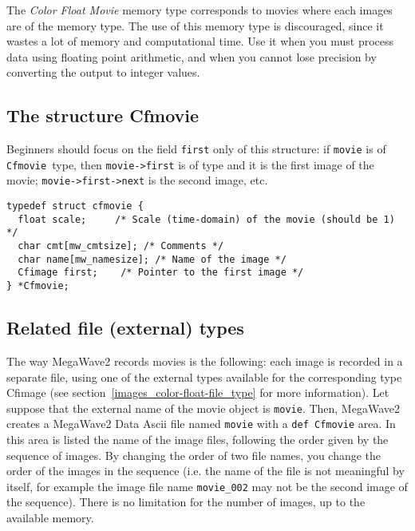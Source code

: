 \label{movies_color-float-movies}
\def\cfmovie{{\tt Cfmovie }}
\index{structure!\cfmovie}

The {\em Color Float Movie} memory type corresponds to movies where each images are of the \cfimage memory type. 
The use of this memory type is discouraged, since it wastes a lot of memory and computational time.
Use it when you must process data using floating point arithmetic, and when 
you cannot lose precision by converting the output to integer values.

\subsection{The structure Cfmovie}
\label{movies_color-float-movies_structure}

 Beginners should focus on the field \verb+first+ only of this structure:
if \verb+movie+ is of \cfmovie type, then \verb+movie->first+ is of \cfimage
type and it is the first image of the movie; \verb+movie->first->next+ is
the second image, etc.

{\small
\begin{verbatim}
typedef struct cfmovie {
  float scale;     /* Scale (time-domain) of the movie (should be 1) */
  char cmt[mw_cmtsize]; /* Comments */
  char name[mw_namesize]; /* Name of the image */
  Cfimage first;    /* Pointer to the first image */
} *Cfmovie;
\end{verbatim}
}

\subsection{Related file (external) types}
\label{movies_color-float-file_type}

The way MegaWave2 records movies is the following:
each image is recorded in a separate file, using one of the external types available for the corresponding type Cfimage (see section~\ref{images_color-float-file_type} for more information).
Let suppose that the external name of the movie object is \verb+movie+.
Then, MegaWave2 creates a MegaWave2 Data Ascii file named \verb+movie+ with a \verb+def Cfmovie+ area.
In this area is listed the name of the image files, following the order given by the sequence of images.
By changing the order of two file names, you change the order of the images in the sequence (i.e. the name of
the file is not meaningful by itself, for example the image file name \verb+movie_002+ may not be the second
image of the sequence).
There is no limitation for the number of images, up to the available memory.

